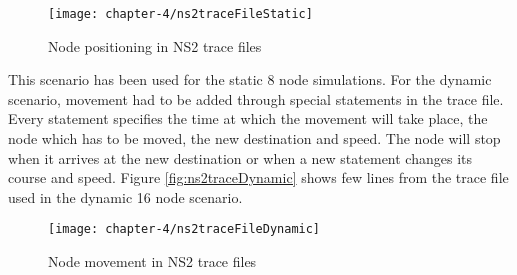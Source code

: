 \begin{figure}[H]
  \centering
  \texttt{[image: chapter-4/ns2traceFileStatic]}
  \caption{Node positioning in NS2 trace files}
  \label{fig:ns2traceFileStatic}
\end{figure}

\newpage

This scenario has been used for the static 8 node simulations. For the dynamic scenario, movement had to be added through special statements in the trace file. Every statement specifies the time at which the movement will take place, the node which has to be moved, the new destination and speed. The node will stop when it arrives at the new destination or when a new statement changes its course and speed. Figure \ref{fig:ns2traceDynamic} shows few lines from the trace file used in the dynamic 16 node scenario.

\begin{figure}[H]
  \centering
  \texttt{[image: chapter-4/ns2traceFileDynamic]}
  \caption{Node movement in NS2 trace files}
  \label{fig:ns2traceFileDynamic}
\end{figure}




